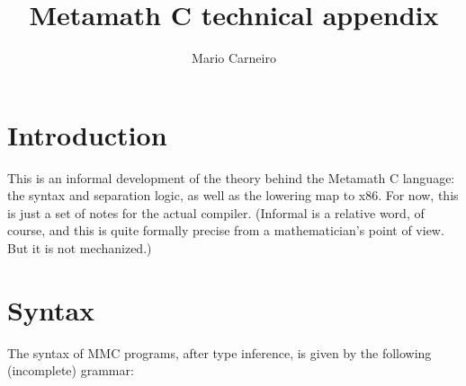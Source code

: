 \documentclass[acmsmall,nonacm]{acmart}
\begin{document}

\title{Metamath C technical appendix}

\author{Mario Carneiro}


\maketitle


\section{Introduction}

This is an informal development of the theory behind the Metamath C language: the syntax and separation logic, as well as the lowering map to x86. For now, this is just a set of notes for the actual compiler. (Informal is a relative word, of course, and this is quite formally precise from a mathematician's point of view. But it is not mechanized.)

\section{Syntax}

The syntax of MMC programs, after type inference, is given by the following (incomplete) grammar:
\end{document}
